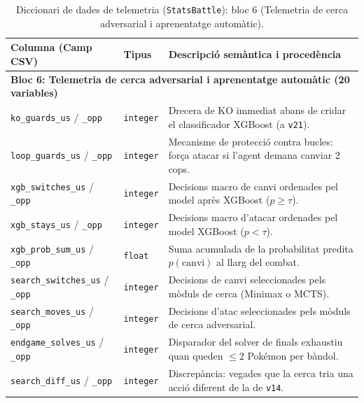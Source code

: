 \begin{table}[htbp]
\centering
\caption{Diccionari de dades de telemetria (\texttt{StatsBattle}): bloc 6 (Telemetria de cerca adversarial i aprenentatge automàtic).}
\label{tab:app_telemetry_part3}
\footnotesize
\renewcommand{\arraystretch}{1.12}
\begin{tabularx}{\textwidth}{lp{1.8cm}>{\raggedright\arraybackslash}X}
\toprule
\textbf{Columna (Camp CSV)} & \textbf{Tipus} & \textbf{Descripció semàntica i procedència} \\
\midrule
\multicolumn{3}{l}{\textbf{Bloc 6: Telemetria de cerca adversarial i aprenentatge automàtic (20 variables)}} \\
\midrule
\texttt{ko\_guards\_us} / \texttt{\_opp} & \texttt{integer} & Drecera de KO immediat abans de cridar el classificador XGBoost (a \texttt{v21}). \\
\texttt{loop\_guards\_us} / \texttt{\_opp} & \texttt{integer} & Mecanisme de protecció contra bucles: força atacar si l'agent demana canviar 2 cops. \\
\texttt{xgb\_switches\_us} / \texttt{\_opp} & \texttt{integer} & Decisions macro de canvi ordenades pel model après XGBoost ($p \ge \tau$). \\
\texttt{xgb\_stays\_us} / \texttt{\_opp} & \texttt{integer} & Decisions macro d'atacar ordenades pel model XGBoost ($p < \tau$). \\
\texttt{xgb\_prob\_sum\_us} / \texttt{\_opp} & \texttt{float} & Suma acumulada de la probabilitat predita $p(\text{canvi})$ al llarg del combat. \\
\texttt{search\_switches\_us} / \texttt{\_opp} & \texttt{integer} & Decisions de canvi seleccionades pels mòduls de cerca (Minimax o MCTS). \\
\texttt{search\_moves\_us} / \texttt{\_opp} & \texttt{integer} & Decisions d'atac seleccionades pels mòduls de cerca adversarial. \\
\texttt{endgame\_solves\_us} / \texttt{\_opp} & \texttt{integer} & Disparador del solver de finals exhaustiu quan queden $\le 2$ Pokémon per bàndol. \\
\texttt{search\_diff\_us} / \texttt{\_opp} & \texttt{integer} & Discrepància: vegades que la cerca tria una acció diferent de la de \texttt{v14}. \\
\bottomrule
\end{tabularx}
\end{table}

